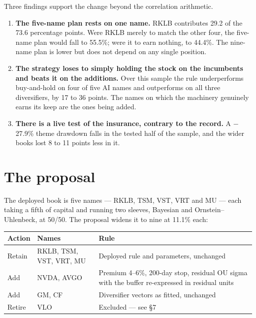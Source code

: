 \documentclass[11pt]{article}
\begin{document}
Three findings support the change beyond the correlation arithmetic.

\begin{enumerate}[leftmargin=1.5em,itemsep=4pt,topsep=4pt]
  \item \textbf{The five-name plan rests on one name.} RKLB contributes 29.2 of the 73.6
        percentage points. Were RKLB merely to match the other four, the five-name plan would
        fall to 55.5\%; were it to earn nothing, to 44.4\%. The nine-name plan is lower but
        does not depend on any single position.
  \item \textbf{The strategy loses to simply holding the stock on the incumbents and beats it
        on the additions.} Over this sample the rule underperforms buy-and-hold on four of five
        AI names and outperforms on all three diversifiers, by 17 to 36 points. The names on
        which the machinery genuinely earns its keep are the ones being added.
  \item \textbf{There is a live test of the insurance, contrary to the record.} A $-$27.9\%
        theme drawdown falls in the tested half of the sample, and the wider books lost 8 to 11
        points less in it.
\end{enumerate}

\section{The proposal}

The deployed book is five names --- RKLB, TSM, VST, VRT and MU --- each taking a fifth of
capital and running two sleeves, Bayesian and Ornstein--Uhlenbeck, at 50/50. The proposal
widens it to nine at 11.1\% each:

\begin{table}[H]\centering\small
\begin{tabular}{llp{}}
\toprule
\textbf{Action} & \textbf{Names} & \textbf{Rule} \\
\midrule
Retain & RKLB, TSM, VST, VRT, MU & Deployed rule and parameters, unchanged \\
Add & NVDA, AVGO & Premium 4--6\%, 200-day stop, residual OU sigma with the
                   buffer re-expressed in residual units \\
Add & GM, CF & Diversifier vectors as fitted, unchanged \\
Retire & VLO & Excluded --- see \S7 \\
\bottomrule
\end{tabular}
\end{table}
\end{document}
